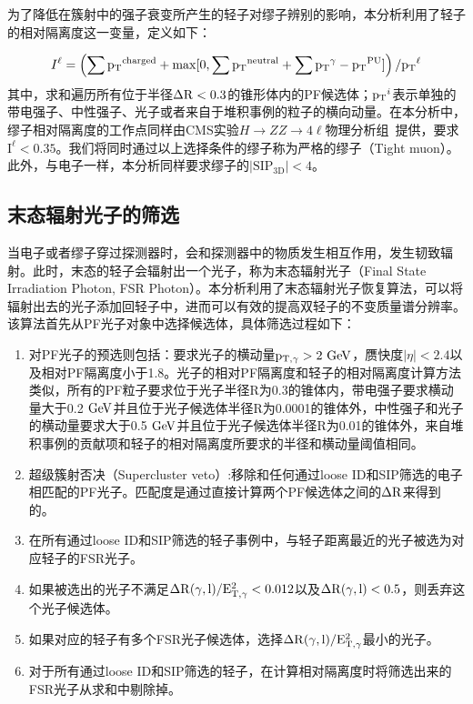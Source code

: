 为了降低在簇射中的强子衰变所产生的轻子对缪子辨别的影响，本分析利用了轻子的相对隔离度这一变量，定义如下：

\begin{equation}\label{eq:4-01}
    I^{\ell} = \left(\sum \mathrm{p_{T}}^{\text{charged}}+\max[0,\sum \mathrm{p_{T}}^{\text{neutral}}+\sum \mathrm{p_{T}}^{\gamma}-\mathrm{p_{T}}^{\text{PU}}]\right)/\mathrm{p_{T}}^{\ell}
\end{equation}
其中，求和遍历所有位于半径$\mathrm{\Delta R}<0.3$的锥形体内的PF候选体；$\mathrm{p_{T}}^{i}$表示单独的带电强子、中性强子、光子或者来自于堆积事例的粒子的横向动量。在本分析中，缪子相对隔离度的工作点同样由CMS实验$H\rightarrow ZZ\rightarrow 4\ell$物理分析组~\cite{cmsHZZ}提供，要求$\mathrm{I^{\ell}<0.35}$。我们将同时通过以上选择条件的缪子称为严格的缪子（Tight muon）。此外，与电子一样，本分析同样要求缪子的$\mathrm{|SIP_{3D}|<4}$。

\subsection{末态辐射光子的筛选}

当电子或者缪子穿过探测器时，会和探测器中的物质发生相互作用，发生韧致辐射。此时，末态的轻子会辐射出一个光子，称为末态辐射光子（Final State Irradiation Photon, FSR Photon）。本分析利用了末态辐射光子恢复算法，可以将辐射出去的光子添加回轻子中，进而可以有效的提高双轻子的不变质量谱分辨率。该算法首先从PF光子对象中选择候选体，具体筛选过程如下：
\begin{enumerate}
    \item 对PF光子的预选则包括：要求光子的横动量$\mathrm{p_{T,\gamma}}>2\GeV$，赝快度$|\eta|<2.4$以及相对PF隔离度小于1.8。光子的相对PF隔离度和轻子的相对隔离度计算方法类似，所有的PF粒子要求位于光子半径R为0.3的锥体内，带电强子要求横动量大于0.2$\GeV$并且位于光子候选体半径R为0.0001的锥体外，中性强子和光子的横动量要求大于0.5$\GeV$并且位于光子候选体半径R为0.01的锥体外，来自堆积事例的贡献项和轻子的相对隔离度所要求的半径和横动量阈值相同。
    \item 超级簇射否决（Supercluster veto）:移除和任何通过loose ID和SIP筛选的电子相匹配的PF光子。匹配度是通过直接计算两个PF候选体之间的$\mathrm{\Delta R}$来得到的。
    \item 在所有通过loose ID和SIP筛选的轻子事例中，与轻子距离最近的光子被选为对应轻子的FSR光子。
    \item 如果被选出的光子不满足$\mathrm{\mathrm{\Delta R}(\gamma, l) / E_{T, \gamma}^{2}<0.012}$以及$\mathrm{\mathrm{\Delta R}(\gamma, l)<0.5}$，则丢弃这个光子候选体。
    \item 如果对应的轻子有多个FSR光子候选体，选择$\mathrm{\mathrm{\Delta R}(\gamma, l) / E_{T, \gamma}^{2}}$最小的光子。
    \item 对于所有通过loose ID和SIP筛选的轻子，在计算相对隔离度时将筛选出来的FSR光子从求和中剔除掉。
\end{enumerate}


